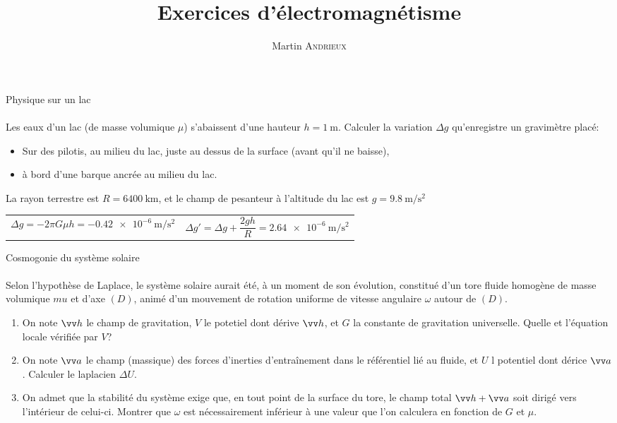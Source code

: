\documentclass[french, a4paper, 11pt]{article}
\title{Exercices d'électromagnétisme}
\author{Martin \textsc{Andrieux}}
\date{}
\begin{document}
\maketitle

\begin{cadre}{Physique sur un lac}
  \paragraph*{}
  Les eaux d'un lac (de masse volumique $\mu$) s'abaissent d'une hauteur $h=\SI{1}{\meter}$. Calculer la variation $\Delta g$ qu'enregistre un gravimètre placé:
  \begin{itemize}[label=$\bullet$]
    \item Sur des pilotis, au milieu du lac, juste au dessus de la surface (avant qu'il ne baisse),
    \item à bord d'une barque ancrée au milieu du lac.
  \end{itemize}
  La rayon terrestre est $R=\SI{6400}{\kilo\meter}$, et le champ de pesanteur à l'altitude du lac est $g=\SI{9,8}{\meter\per\square\second}$
  \tcblower
  \begin{tabularx}{\linewidth}{Xr}
    $\Delta g = -2\pi G\mu h = \SI{-0.42e-6}{\meter\per\square\second}$&
    $\Delta g' = \Delta g + \dfrac{2gh}{R} = \SI{2.64e-6}{\meter\per\square\second}$
  \end{tabularx}
\end{cadre}

\begin{cadre}{Cosmogonie du système solaire}
  \paragraph*{}
  Selon l'hypothèse de Laplace, le système solaire aurait été, à un moment de son évolution, constitué d'un tore fluide homogène de masse volumique $mu$ et d'axe $(D)$, animé d'un mouvement de rotation uniforme de vitesse angulaire $\omega$ autour de $(D)$.
  \begin{enumerate}[label=\upshape\alph*)]
    \item On note $\vv h$ le champ de gravitation, $V$ le potetiel dont dérive $\vv h$, et $G$ la constante de gravitation universelle. Quelle et l'équation locale vérifiée par $V$?
    \item On note $\vv a$ le champ (massique) des forces d'inerties d'entraînement dans le référentiel lié au fluide, et $U$ l potentiel dont dérice $\vv a$. Calculer le laplacien $\Delta U$.
    \item On admet que la stabilité du système exige que, en tout point de la surface du tore, le champ total $\vv h + \vv a$ soit dirigé vers l'intérieur de celui-ci. Montrer que $\omega$ est nécessairement inférieur à une valeur que l'on calculera en fonction de $G$ et $\mu$.
  \end{enumerate}
\end{cadre}
\end{document}
